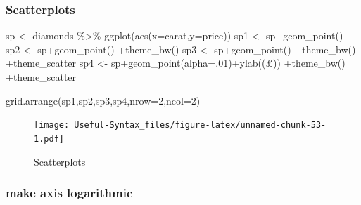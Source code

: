\documentclass[
]{article}
\newenvironment{Shaded}{\begin{snugshade}}{\end{snugshade}}
\newcommand{\AttributeTok}[1]{\textcolor[rgb]{0.77,0.63,0.00}{#1}}
\newcommand{\DecValTok}[1]{\textcolor[rgb]{0.00,0.00,0.81}{#1}}
\newcommand{\FunctionTok}[1]{\textcolor[rgb]{0.00,0.00,0.00}{#1}}
\newcommand{\NormalTok}[1]{#1}
\newcommand{\OtherTok}[1]{\textcolor[rgb]{0.56,0.35,0.01}{#1}}
\newcommand{\SpecialCharTok}[1]{\textcolor[rgb]{0.00,0.00,0.00}{#1}}
\newcommand{\StringTok}[1]{\textcolor[rgb]{0.31,0.60,0.02}{#1}}
\begin{document}
\hypertarget{scatterplots}{%
\subsubsection{Scatterplots}\label{scatterplots}}

\begin{Shaded}
\begin{Highlighting}[]
\NormalTok{sp }\OtherTok{\textless{}{-}}\NormalTok{ diamonds }\SpecialCharTok{\%\textgreater{}\%} \FunctionTok{ggplot}\NormalTok{(}\FunctionTok{aes}\NormalTok{(}\AttributeTok{x=}\NormalTok{carat,}\AttributeTok{y=}\NormalTok{price))}
\NormalTok{sp1 }\OtherTok{\textless{}{-}}\NormalTok{ sp}\SpecialCharTok{+}\FunctionTok{geom\_point}\NormalTok{()}
\NormalTok{sp2 }\OtherTok{\textless{}{-}}\NormalTok{ sp}\SpecialCharTok{+}\FunctionTok{geom\_point}\NormalTok{() }\SpecialCharTok{+}\FunctionTok{theme\_bw}\NormalTok{()}
\NormalTok{sp3 }\OtherTok{\textless{}{-}}\NormalTok{ sp}\SpecialCharTok{+}\FunctionTok{geom\_point}\NormalTok{() }\SpecialCharTok{+}\FunctionTok{theme\_bw}\NormalTok{() }\SpecialCharTok{+}\NormalTok{theme\_scatter}
\NormalTok{sp4 }\OtherTok{\textless{}{-}}\NormalTok{ sp}\SpecialCharTok{+}\FunctionTok{geom\_point}\NormalTok{(}\AttributeTok{alpha=}\NormalTok{.}\DecValTok{01}\NormalTok{)}\SpecialCharTok{+}\FunctionTok{ylab}\NormalTok{(}\StringTok{\textquotesingle{}(£)\textquotesingle{}}\NormalTok{) }\SpecialCharTok{+}\FunctionTok{theme\_bw}\NormalTok{() }\SpecialCharTok{+}\NormalTok{theme\_scatter}


\FunctionTok{grid.arrange}\NormalTok{(sp1,sp2,sp3,sp4,}\AttributeTok{nrow=}\DecValTok{2}\NormalTok{,}\AttributeTok{ncol=}\DecValTok{2}\NormalTok{)}
\end{Highlighting}
\end{Shaded}

\begin{figure}
\centering
\texttt{[image: Useful-Syntax\_files/figure-latex/unnamed-chunk-53-1.pdf]}
\caption{\label{fig:unnamed-chunk-53}Scatterplots}
\end{figure}

\hypertarget{make-axis-logarithmic}{%
\subsubsection{make axis logarithmic}\label{make-axis-logarithmic}}
\end{document}

